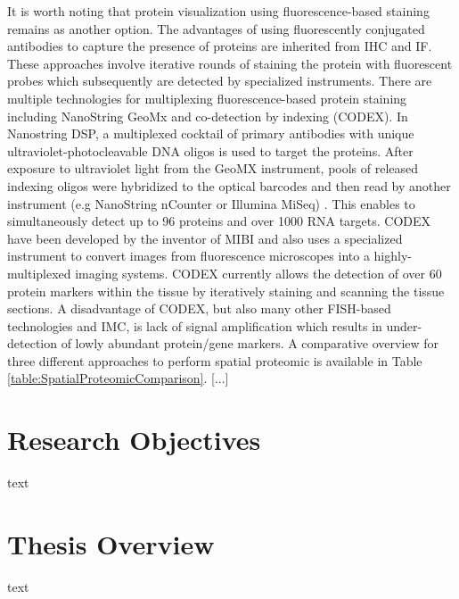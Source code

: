 It is worth noting that protein visualization using fluorescence-based staining remains as another option. The advantages of using fluorescently conjugated antibodies to capture the presence of proteins are inherited from IHC and IF. These approaches involve iterative rounds of staining the protein with fluorescent probes which subsequently are detected by specialized instruments. There are multiple technologies for multiplexing fluorescence-based protein staining including NanoString GeoMx and co-detection by indexing (CODEX). In Nanostring DSP, a multiplexed cocktail of primary antibodies with  unique ultraviolet-photocleavable DNA oligos is used to target the proteins. After exposure to ultraviolet light from the GeoMX instrument, pools of released indexing oligos were hybridized to the optical barcodes and then read by another instrument (e.g NanoString nCounter or Illumina MiSeq) \cite{de2020unraveling, helmink2020b}. This enables to simultaneously detect up to 96 proteins and over 1000 RNA targets. CODEX have been developed by the inventor of MIBI and also uses a specialized instrument to convert images from fluorescence microscopes into a highly-multiplexed imaging systems. CODEX currently allows the detection of over 60 protein markers within the tissue by iteratively staining and scanning the tissue sections\cite{goltsev2018deep}. A disadvantage of CODEX, but also many other FISH-based technologies and IMC, is lack of signal amplification which results in under-detection of lowly abundant protein/gene markers. A comparative overview for three different approaches to perform spatial proteomic is available in Table \ref{table:SpatialProteomicComparison}. [...]

\section{Research Objectives}
text
\section{Thesis Overview}
text
% 
% 
